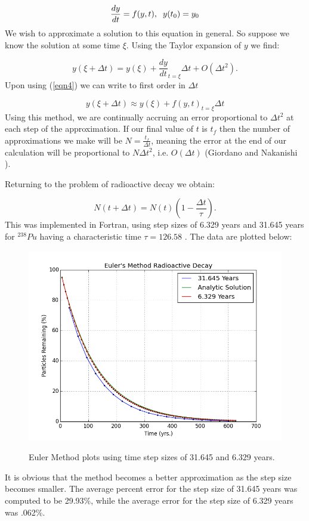 \documentclass{article}
\begin{document}
\begin{equation}
\frac{dy}{dt}=f(y,t), \hspace{.2cm} y(t_0)=y_0
\label{eqn4}
\end{equation}
We wish to approximate a solution to this equation in general. So suppose we know the solution at some time $\xi$. Using the Taylor expansion of $y$ we find:

\begin{equation}
y(\xi+\Delta t) = y(\xi)+\frac{dy}{dt}_{t=\xi} \Delta t+O(\Delta t^2).
\label{eqn5}
\end{equation}
Upon using (\ref{eqn4}) we can write to first order in $\Delta t$

\begin{equation}
y(\xi+\Delta t) \approx y(\xi)+f(y,t)_{t=\xi}\Delta t
\label{eqn6}
\end{equation}
Using this method, we are continually accruing an error proportional to $\Delta t^2$ at each step of the approximation. If our final value of $t$ is $t_f$ then the number of approximations we make will be $N=\frac{t_f}{\Delta t}$, meaning the error at the end of our calculation will be proportional to $N \Delta t^2$, i.e. $O(\Delta t)$ (Giordano and Nakanishi \cite{GiordanoNakanishi}).

Returning to the problem of radioactive decay we obtain:

\begin{equation}
N(t+\Delta t) = N(t)(1-\frac{\Delta t}{\tau}).
\label{eqn7}
\end{equation}
This was implemented in Fortran, using step sizes of 6.329 years and 31.645 years for $^{238}Pu$ having a characteristic time $\tau = 126.58 $ . The data are plotted below:

\begin{figure}[H]
	\begin{center}
		\includegraphics[scale=.5]{EulerPlots.png}
		\label{EulerPlots}
		\caption{Euler Method plots using time step sizes of 31.645 and 6.329 years.}
	\end{center}
\end{figure}
It is obvious that the method becomes a better approximation as the step size becomes smaller. The average percent error for the step size of 31.645 years was computed to be 29.93\%, while the average error for the step size of 6.329 years was .062\%.
\end{document}
